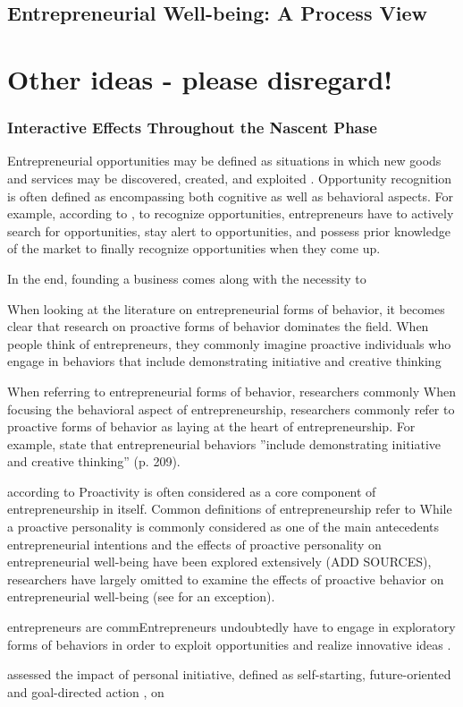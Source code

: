 \documentclass[a4paper,man,noextraspace,natbib]{apa6}
\begin{document}
\subsection{Entrepreneurial Well-being: A Process View}

\section{Other ideas - please disregard!}
\subsubsection{Interactive Effects Throughout the Nascent Phase}
Entrepreneurial opportunities may be defined as situations in which new goods and services may be discovered, created, and exploited \citep{Venkataraman.2019}. Opportunity recognition is often defined as encompassing both cognitive as well as behavioral aspects. For example, according to \cite{Baron2006}, to recognize opportunities, entrepreneurs have to actively search for opportunities, stay alert to opportunities, and possess prior knowledge of the market to finally recognize opportunities when they come up. 

In the end, founding a business comes along with the necessity to 

When looking at the literature on entrepreneurial forms of behavior, it becomes clear that research on proactive forms of behavior dominates the field. When people think of entrepreneurs, they commonly imagine proactive individuals who engage in behaviors that include demonstrating initiative and creative thinking

 When referring to entrepreneurial forms of behavior, researchers commonly When focusing the behavioral aspect of entrepreneurship, researchers commonly refer to proactive forms of behavior as laying at the heart of entrepreneurship. For example, \cite{Hisrich1990} state that entrepreneurial behaviors ''include demonstrating initiative and creative thinking'' (p. 209). 

according to Proactivity is often considered as a core component of entrepreneurship in itself. Common definitions of entrepreneurship refer to 
While a proactive personality is commonly considered as one of the main antecedents entrepreneurial intentions \cite[e.g.][]{Crant1996} and the effects of proactive personality on entrepreneurial well-being have been explored extensively (ADD SOURCES), researchers have largely omitted to examine the effects of proactive behavior on entrepreneurial well-being (see \cite{Hahn2012} for an exception). 

entrepreneurs are commEntrepreneurs undoubtedly have to engage in exploratory forms of behaviors in order to exploit opportunities and realize innovative ideas \cite[e.g.,][]{Dess1999}. 

\cite{Hahn2012} assessed the impact of personal initiative, defined as self-starting, future-oriented and goal-directed action \citep{Bledow2009}, on 


\end{document}
